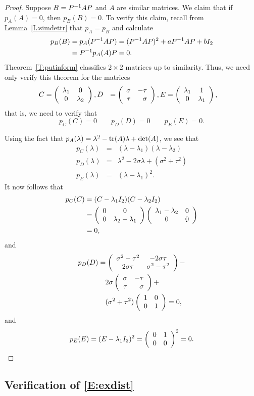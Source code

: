 \documentclass{ximera}
\begin{document}
\begin{proof}  Suppose $B=P^{-1} AP$ and $A$ are similar matrices.  We claim that
if $p_A(A)=0$, then $p_B(B)=0$.  To verify this claim, recall from
Lemma~\ref{L:simdettr} that $p_A=p_B$ and calculate
\begin{align*}
  p_B(B) &= p_A(P^{-1} AP) = (P^{-1} AP)^2 + aP^{-1} AP + bI_2 \\
  &= P^{-1} p_A(A)P= 0.
\end{align*}
Theorem~\ref{T:putinform} classifies $2\times 2$ matrices up to similarity.
Thus, we need only verify this theorem for the matrices
\begin{align*}
C &=  \left(\begin{array}{cc} \lambda_1 & 0\\ 0 &\lambda_2\end{array}\right),
D &=  \left(\begin{array}{rr} \sigma & -\tau\\ \tau &\sigma\end{array}\right),
E &=  \left(\begin{array}{cc} \lambda_1 & 1\\ 0 &\lambda_1\end{array}\right),
\end{align*}
that is, we need to verify that
\[
p_C(C) = 0 \qquad p_D(D)=0 \qquad p_E(E)=0.
\]

Using the fact that $p_A(\lambda)=\lambda^2-{\rm tr}(A)\lambda+\det(A)$, we see
that
\begin{eqnarray*}
p_C(\lambda) & = & (\lambda-\lambda_1)(\lambda-\lambda_2) \\
p_D(\lambda) & = & \lambda^2 - 2\sigma \lambda + (\sigma^2+\tau^2) \\
p_E(\lambda) & = & (\lambda-\lambda_1)^2.
\end{eqnarray*}
It now follows that
\begin{align*}
  p_C(C) &= (C-\lambda_1I_2)(C-\lambda_2I_2) 
           \\
&=\left(\begin{array}{cc} 0 & 0\\ 0 &\lambda_2-\lambda_1\end{array}\right)\left(\begin{array}{cc} \lambda_1-\lambda_2 & 0\\ 0 &0\end{array}\right) \\
&=0,
\end{align*}
and
\begin{align*}
p_D(D) &=
\left(\begin{array}{cc} \sigma^2-\tau^2 & -2\sigma\tau\\ 2\sigma\tau &\sigma^2-\tau^2\end{array}\right) -\\
       &\quad 2\sigma \left(\begin{array}{rr} \sigma & -\tau\\ \tau &\sigma\end{array}\right) + \\
  &\quad (\sigma^2+\tau^2)\left(\begin{array}{rr} 1 & 0\\ 0 &1\end{array}\right) = 0,
\end{align*}
and
\[
p_E(E) = (E-\lambda_1I_2)^2 = \left(\begin{array}{rr} 0 & 1\\ 0 &0\end{array}\right)^2 = 0.
\]
\end{proof}



\subsection*{Verification of \protect\eqref{E:exdist}}
\end{document}
